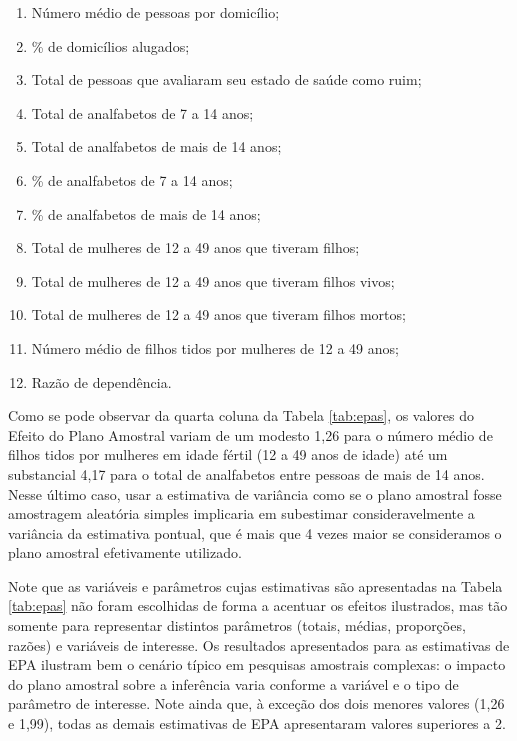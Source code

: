 \documentclass[
]{book}
\providecommand{\tightlist}{%
  \setlength{\itemsep}{0pt}\setlength{\parskip}{0pt}}
\begin{document}
\begin{enumerate}
\def\labelenumi{\arabic{enumi}.}
\tightlist
\item
  Número médio de pessoas por domicílio;
\item
  \% de domicílios alugados;
\item
  Total de pessoas que avaliaram seu estado de saúde como ruim;
\item
  Total de analfabetos de 7 a 14 anos;
\item
  Total de analfabetos de mais de 14 anos;
\item
  \% de analfabetos de 7 a 14 anos;
\item
  \% de analfabetos de mais de 14 anos;
\item
  Total de mulheres de 12 a 49 anos que tiveram filhos;
\item
  Total de mulheres de 12 a 49 anos que tiveram filhos vivos;
\item
  Total de mulheres de 12 a 49 anos que tiveram filhos mortos;
\item
  Número médio de filhos tidos por mulheres de 12 a 49 anos;
\item
  Razão de dependência.
\end{enumerate}

Como se pode observar da quarta coluna da Tabela \ref{tab:epas}, os valores do
Efeito do Plano Amostral variam de um modesto 1,26 para o número
médio de filhos tidos por mulheres em idade fértil (12 a 49 anos de
idade) até um substancial 4,17 para o total de analfabetos entre pessoas
de mais de 14 anos. Nesse último caso, usar a estimativa de
variância como se o plano amostral fosse amostragem aleatória
simples implicaria em subestimar consideravelmente a variância da
estimativa pontual, que é mais que 4 vezes maior se consideramos o plano
amostral efetivamente utilizado.

Note que as variáveis e parâmetros cujas estimativas são apresentadas
na Tabela \ref{tab:epas} não foram escolhidas de forma a acentuar os
efeitos ilustrados, mas tão somente para representar distintos parâmetros
(totais, médias, proporções, razões) e variáveis de interesse. Os resultados
apresentados para as estimativas de EPA ilustram bem o cenário típico em pesquisas
amostrais complexas: o impacto do plano amostral sobre a inferência varia conforme
a variável e o tipo de parâmetro de interesse. Note ainda que, à exceção dos dois
menores valores (1,26 e 1,99), todas as demais estimativas de EPA apresentaram
valores superiores a 2.
\end{document}
